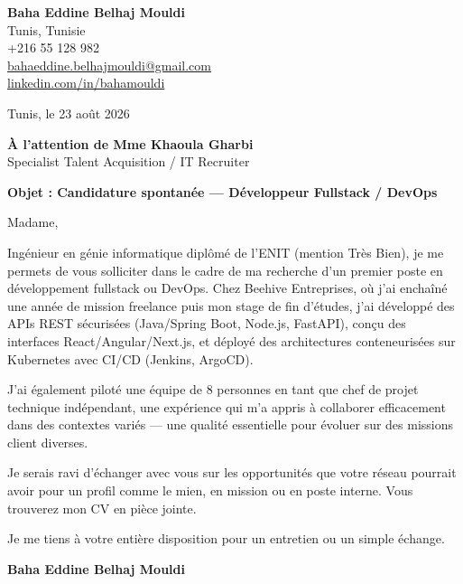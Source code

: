\documentclass[a4paper,11pt]{article}
\begin{document}
\begin{flushright}
{\bfseries Baha Eddine Belhaj Mouldi}\\
Tunis, Tunisie\\
+216 55 128 982\\
\href{mailto:bahaeddine.belhajmouldi@gmail.com}{bahaeddine.belhajmouldi@gmail.com}\\
\href{https://linkedin.com/in/bahamouldi}{linkedin.com/in/bahamouldi}
\end{flushright}
\vspace{0.8cm}
\begin{flushleft}
Tunis, le 23 ao\^ut 2026
\vspace{0.8cm}

{\bfseries \`A l'attention de Mme Khaoula Gharbi}\\
Specialist Talent Acquisition / IT Recruiter
\vspace{0.6cm}

{\bfseries Objet : Candidature spontan\'ee --- D\'eveloppeur Fullstack / DevOps}
\end{flushleft}
\vspace{0.6cm}
Madame,

Ing\'enieur en g\'enie informatique dipl\^om\'e de l'ENIT (mention Tr\`es Bien), je me permets de vous solliciter dans le cadre de ma recherche d'un premier poste en d\'eveloppement fullstack ou DevOps. Chez Beehive Entreprises, o\`u j'ai encha\^in\'e une ann\'ee de mission freelance puis mon stage de fin d'\'etudes, j'ai d\'evelopp\'e des APIs REST s\'ecuris\'ees (Java/Spring Boot, Node.js, FastAPI), con\c cu des interfaces React/Angular/Next.js, et d\'eploy\'e des architectures conteneuris\'ees sur Kubernetes avec CI/CD (Jenkins, ArgoCD).

J'ai \'egalement pilot\'e une \'equipe de 8 personnes en tant que chef de projet technique ind\'ependant, une exp\'erience qui m'a appris \`a collaborer efficacement dans des contextes vari\'es --- une qualit\'e essentielle pour \'evoluer sur des missions client diverses.

Je serais ravi d'\'echanger avec vous sur les opportunit\'es que votre r\'eseau pourrait avoir pour un profil comme le mien, en mission ou en poste interne. Vous trouverez mon CV en pi\`ece jointe.

Je me tiens \`a votre enti\`ere disposition pour un entretien ou un simple \'echange.

\vspace{0.8cm}
\begin{flushright}
{\bfseries Baha Eddine Belhaj Mouldi}
\end{flushright}
\end{document}
